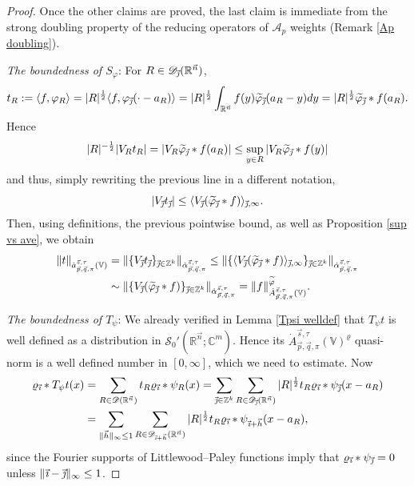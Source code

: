 \documentclass[11pt, reqno]{amsart}
\theoremstyle{definition}
\theoremstyle{remark}
\numberwithin{equation}{section}
\newcommand{\A}{\mathscr A}
\newcommand{\C}{\mathbb C}
\newcommand{\D}{\mathscr D}
\newcommand{\R}{\mathbb R}
\newcommand{\Sc}{\mathscr S}
\newcommand{\V}{\mathbb V}
\newcommand{\Z}{\mathbb Z}
\newcommand{\vh}{\vec h}
\newcommand{\vi}{\vec{\textit{\i}}}
\newcommand{\vj}{\vec{\textit{\j}}}
\newcommand{\vn}{\vec n}
\newcommand{\vp}{\vec p}
\newcommand{\vq}{\vec q}
\newcommand{\vs}{\vec s}
\newcommand{\Atau}{\dot A^{\vs,\tau}_{\vp,\vq,\pi}}
\newcommand{\atau}{\dot a^{\vs,\tau}_{\vp,\vq,\pi}}
\newcommand{\aatau}{\dot{\alpha}^{\vs,\tau}_{\vp,\vq,\pi}}
\newcommand{\Ave}[3]{\langle#1\rangle_{#2,#3}}
\newcommand{\pair}[2]{\langle #1, #2 \rangle}
\newcommand{\abs}[1]{|#1|}
\newcommand{\Norm}[2]{\|#1\|_{#2}}
\begin{document}
\begin{proof}
Once the other claims are proved, the last claim is immediate from the strong doubling property of the reducing operators of $\A_p$ weights (Remark \ref{Ap doubling}).

\textit{The boundedness of $S_\varphi$}: For $R\in\D_{\vj}(\R^{\vn})$,
\begin{equation*}
t_R:=\pair{f}{\varphi_R}
=\abs{R}^{\frac12}\pair{f}{\varphi_{\vj}(\cdot-a_R)}
=\abs{R}^{\frac12}\int_{\R^{\vn}}f(y)\widetilde\varphi_{\vj}(a_R-y)dy
=\abs{R}^{\frac12}\widetilde\varphi_{\vj}*f(a_R).
\end{equation*}
Hence
\begin{equation*}
\abs{R}^{-\frac12}\abs{V_R t_R}=\abs{V_R\widetilde\varphi_{\vj}*f(a_R)}
\leq\sup_{y\in R}\abs{V_R\widetilde\varphi_{\vj}*f(y)}
\end{equation*}
and thus, simply rewriting the previous line in a different notation,
\begin{equation*}
\abs{V_{\vj}t_{\vj}}\leq\Ave{V_{\vj}(\widetilde\varphi_{\vj}*f)}{\vj}{\infty}.
\end{equation*}
Then, using definitions, the previous pointwise bound, as well as Proposition \ref{sup vs ave}, we obtain
\begin{align*}
\Norm{t}{\atau(\V)}
&=\Norm{\{V_{\vj}t_{\vj}\}_{\vj\in\Z^k}}{\aatau}
\leq\Norm{\{\Ave{V_{\vj}(\widetilde\varphi_{\vj}*f)}{\vj}{\infty}\}_{\vj\in\Z^k}}{\aatau}  \\
&\sim\Norm{\{V_{\vj}(\widetilde\varphi_{\vj}*f)\}_{\vj\in\Z^k}}{\aatau}
=\Norm{f}{\Atau(\V)}^{\widetilde\varphi}.
\end{align*}

\textit{The boundedness of $T_\psi$}: We already verified in Lemma \ref{Tpsi welldef} that $T_\psi t$ is well defined as a distribution in $\Sc_0'(\R^{\vn};\C^m)$. Hence its $\Atau(\V)^{\varrho}$ quasi-norm is a well defined number in $[0,\infty]$, which we need to estimate. Now
\begin{align*}
\varrho_{\vi}*T_\psi t(x)
&=\sum_{R\in\D(\R^{\vn})}t_R\varrho_{\vi}*\psi_R(x)
=\sum_{\vj\in\Z^k}\sum_{R\in\D_{\vj}(\R^{\vn})} \abs{R}^{\frac 12}t_R\varrho_{\vi}*\psi_{\vj}(x-a_R) \\
&=\sum_{\Norm{\vh}{\infty}\leq 1}\sum_{R\in\D_{\vi+\vh}(\R^{\vn})} \abs{R}^{\frac 12}t_R\varrho_{\vi}*\psi_{\vi+\vh}(x-a_R),
\end{align*}
since the Fourier supports of Littlewood--Paley functions imply that $\varrho_{\vi}*\psi_{\vj}=0$ unless $\Norm{\vi-\vj}{\infty}\leq 1$.


\end{proof}
\end{document}
